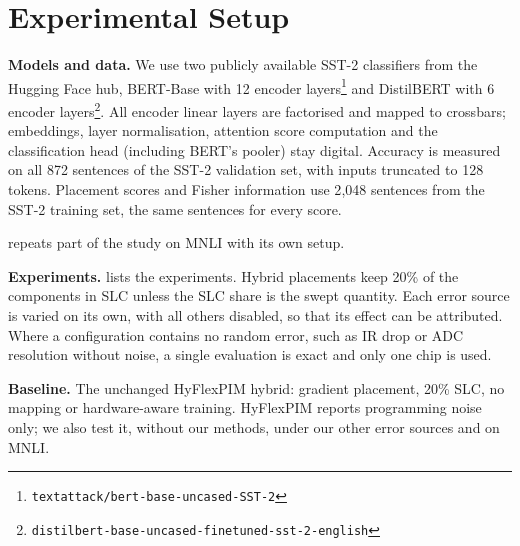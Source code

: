 \section{Experimental Setup}\label{sec:setup}

\textbf{Models and data.} We use two publicly available SST-2 classifiers from the Hugging Face hub,
BERT-Base with 12 encoder layers\footnote{\nolinkurl{textattack/bert-base-uncased-SST-2}} and DistilBERT
with 6 encoder layers\footnote{\nolinkurl{distilbert-base-uncased-finetuned-sst-2-english}}. All encoder
linear layers are factorised and mapped to crossbars; embeddings, layer normalisation, attention
score computation and the classification head (including BERT's pooler) stay digital. Accuracy is measured on all 872 sentences of the
SST-2 validation set, with inputs truncated to 128 tokens. Placement scores and Fisher information use
2{,}048 sentences from the SST-2 training set, the same sentences for every score.

 repeats part of the study on MNLI with its own setup.

\textbf{Experiments.}  lists the experiments. Hybrid placements keep 20\% of
the components in SLC unless the SLC share is the swept quantity. Each error source is varied on its own,
with all others disabled, so that its effect can be attributed. Where a configuration contains no random
error, such as IR drop or ADC resolution without noise, a single evaluation is exact and only one chip is
used.

\textbf{Baseline.} The unchanged HyFlexPIM hybrid: gradient placement, 20\% SLC, no mapping or
hardware-aware training. HyFlexPIM reports programming noise only; we also test it, without our methods,
under our other error sources and on MNLI.

